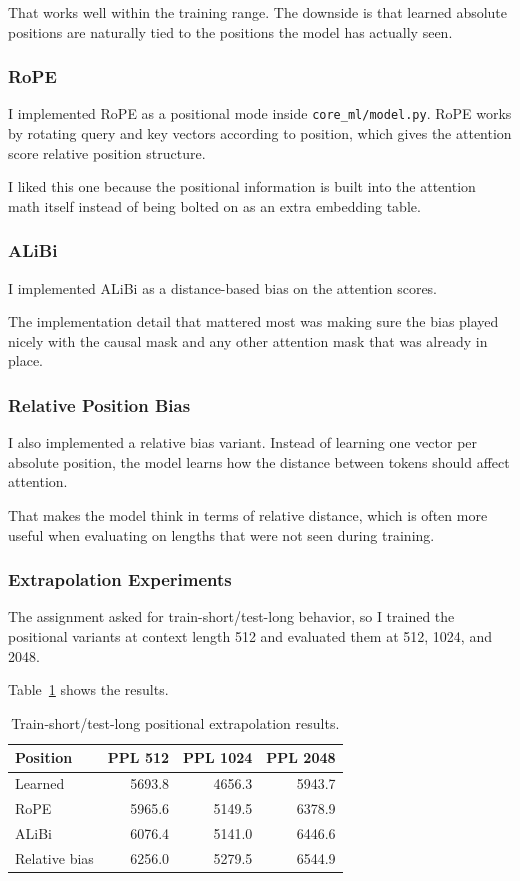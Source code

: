 \documentclass[11pt]{article}
\begin{document}
That works well within the training range. The downside is that learned absolute positions are naturally tied to the positions the model has actually seen.

\subsubsection{RoPE}
I implemented RoPE as a positional mode inside \texttt{core\_ml/model.py}. RoPE works by rotating query and key vectors according to position, which gives the attention score relative position structure.

I liked this one because the positional information is built into the attention math itself instead of being bolted on as an extra embedding table.

\subsubsection{ALiBi}
I implemented ALiBi as a distance-based bias on the attention scores.

The implementation detail that mattered most was making sure the bias played nicely with the causal mask and any other attention mask that was already in place.

\subsubsection{Relative Position Bias}
I also implemented a relative bias variant. Instead of learning one vector per absolute position, the model learns how the distance between tokens should affect attention.

That makes the model think in terms of relative distance, which is often more useful when evaluating on lengths that were not seen during training.

\subsubsection{Extrapolation Experiments}
The assignment asked for train-short/test-long behavior, so I trained the positional variants at context length 512 and evaluated them at 512, 1024, and 2048.

Table~\ref{tab:positional} shows the results.

\begin{table}[h]
\centering
\begin{tabular}{lrrr}
\toprule
Position & PPL 512 & PPL 1024 & PPL 2048 \\
\midrule
Learned & 5693.8 & 4656.3 & 5943.7 \\
RoPE & 5965.6 & 5149.5 & 6378.9 \\
ALiBi & 6076.4 & 5141.0 & 6446.6 \\
Relative bias & 6256.0 & 5279.5 & 6544.9 \\
\bottomrule
\end{tabular}
\caption{Train-short/test-long positional extrapolation results.}
\label{tab:positional}
\end{table}
\end{document}
